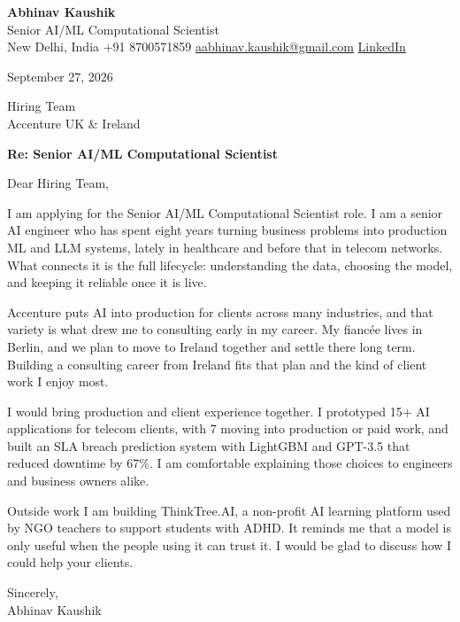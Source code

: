 \documentclass[11pt,a4paper]{article}
\begin{document}
{\Large\bfseries Abhinav Kaushik}\\
Senior AI/ML Computational Scientist\\
New Delhi, India \textbar{} +91 8700571859 \textbar{} \href{mailto:aabhinav.kaushik@gmail.com}{aabhinav.kaushik@gmail.com} \textbar{} \href{https://www.linkedin.com/in/abhinav-kaushik10/}{LinkedIn}  

September 27, 2026

Hiring Team\\
Accenture UK \& Ireland

\textbf{Re: Senior AI/ML Computational Scientist}

Dear Hiring Team,

I am applying for the Senior AI/ML Computational Scientist role. I am a senior AI engineer who has spent eight years turning business problems into production ML and LLM systems, lately in healthcare and before that in telecom networks. What connects it is the full lifecycle: understanding the data, choosing the model, and keeping it reliable once it is live.

Accenture puts AI into production for clients across many industries, and that variety is what drew me to consulting early in my career. My fiancée lives in Berlin, and we plan to move to Ireland together and settle there long term. Building a consulting career from Ireland fits that plan and the kind of client work I enjoy most.

I would bring production and client experience together. I prototyped 15+ AI applications for telecom clients, with 7 moving into production or paid work, and built an SLA breach prediction system with LightGBM and GPT-3.5 that reduced downtime by 67\%. I am comfortable explaining those choices to engineers and business owners alike.

Outside work I am building ThinkTree.AI, a non-profit AI learning platform used by NGO teachers to support students with ADHD. It reminds me that a model is only useful when the people using it can trust it. I would be glad to discuss how I could help your clients.

Sincerely,\\[4pt]
Abhinav Kaushik
\end{document}
